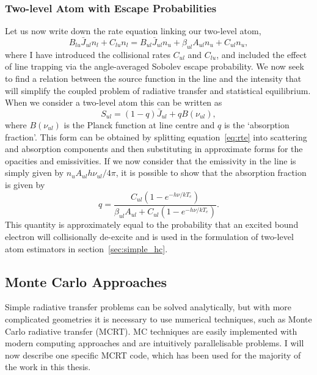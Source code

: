 \subsubsection{Two-level Atom with Escape Probabilities}
Let us now write down the rate equation linking our two-level atom,
\begin{equation}
B_{lu} \bar{J}_{ul} n_l + C_{lu} n_l = 
B_{ul} \bar{J}_{ul} n_u + \beta_{ul} A_{ul} n_u + C_{ul} n_u,
\label{eq:rate_2level}
\end{equation}
where I have introduced the collisional rates $C_{ul}$ and $C_{lu}$, and included
the effect of line trapping via the angle-averaged Sobolev escape probability.
We now seek to find a relation between the source function in the line
and the intensity that will simplify the coupled problem of radiative transfer
and statistical equilibrium. When we consider a two-level atom
this can be written as \citep{mihalas}
\begin{equation}
S_{ul} = (1 - q) \bar{J}_{ul} + q B(\nu_{ul}),
\label{eq:rate_2level}
\end{equation}
where $B(\nu_{ul})$ is the Planck function at line centre and $q$ is the 
`absorption fraction'. This form can be obtained by splitting
equation~\ref{eq:rte} into scattering and absorption components and then
substituting in approximate forms for the opacities and emissivities.
If we now consider that the emissivity in the line is simply give\cal n
by $n_u A_{ul} h \nu_{ul} / 4 \pi$, it is possible to show that
the absorption fraction is given by
\begin{equation}
q = \frac{C_{ul} (1 - e^{-h\nu/kT_e})}{\beta_{ul} A_{ul} + C_{ul} (1 - e^{-h\nu/kT_e})}.
\end{equation}
This quantity is approximately equal to
the probability that an excited bound electron
will collisionally de-excite and is used in the formulation of two-level atom
estimators in section~\ref{sec:simple_hc}.



\subsection{Monte Carlo Approaches}

Simple radiative transfer problems can be solved analytically,
but with more complicated geometries it is necessary to use numerical techniques,
such as Monte Carlo radiative transfer (MCRT). 
MC techniques are easily implemented with modern computing approaches and 
are intuitively parallelisable problems. I will now describe one specific 
MCRT code, which has been used for the majority of the work in this thesis.








